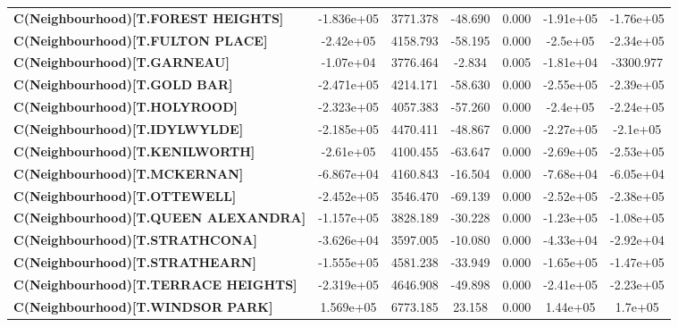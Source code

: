 \documentclass{report}
\begin{document}
\begin{center}
\begin{tabular}{lcccccc}
\textbf{C(Neighbourhood)[T.FOREST HEIGHTS]}  &   -1.836e+05  &     3771.378     &   -48.690  &         0.000        &    -1.91e+05    &    -1.76e+05     \\
\textbf{C(Neighbourhood)[T.FULTON PLACE]}    &    -2.42e+05  &     4158.793     &   -58.195  &         0.000        &     -2.5e+05    &    -2.34e+05     \\
\textbf{C(Neighbourhood)[T.GARNEAU]}         &    -1.07e+04  &     3776.464     &    -2.834  &         0.005        &    -1.81e+04    &    -3300.977     \\
\textbf{C(Neighbourhood)[T.GOLD BAR]}        &   -2.471e+05  &     4214.171     &   -58.630  &         0.000        &    -2.55e+05    &    -2.39e+05     \\
\textbf{C(Neighbourhood)[T.HOLYROOD]}        &   -2.323e+05  &     4057.383     &   -57.260  &         0.000        &     -2.4e+05    &    -2.24e+05     \\
\textbf{C(Neighbourhood)[T.IDYLWYLDE]}       &   -2.185e+05  &     4470.411     &   -48.867  &         0.000        &    -2.27e+05    &     -2.1e+05     \\
\textbf{C(Neighbourhood)[T.KENILWORTH]}      &    -2.61e+05  &     4100.455     &   -63.647  &         0.000        &    -2.69e+05    &    -2.53e+05     \\
\textbf{C(Neighbourhood)[T.MCKERNAN]}        &   -6.867e+04  &     4160.843     &   -16.504  &         0.000        &    -7.68e+04    &    -6.05e+04     \\
\textbf{C(Neighbourhood)[T.OTTEWELL]}        &   -2.452e+05  &     3546.470     &   -69.139  &         0.000        &    -2.52e+05    &    -2.38e+05     \\
\textbf{C(Neighbourhood)[T.QUEEN ALEXANDRA]} &   -1.157e+05  &     3828.189     &   -30.228  &         0.000        &    -1.23e+05    &    -1.08e+05     \\
\textbf{C(Neighbourhood)[T.STRATHCONA]}      &   -3.626e+04  &     3597.005     &   -10.080  &         0.000        &    -4.33e+04    &    -2.92e+04     \\
\textbf{C(Neighbourhood)[T.STRATHEARN]}      &   -1.555e+05  &     4581.238     &   -33.949  &         0.000        &    -1.65e+05    &    -1.47e+05     \\
\textbf{C(Neighbourhood)[T.TERRACE HEIGHTS]} &   -2.319e+05  &     4646.908     &   -49.898  &         0.000        &    -2.41e+05    &    -2.23e+05     \\
\textbf{C(Neighbourhood)[T.WINDSOR PARK]}    &    1.569e+05  &     6773.185     &    23.158  &         0.000        &     1.44e+05    &      1.7e+05     \\

\end{tabular}
\end{center}
\end{document}
